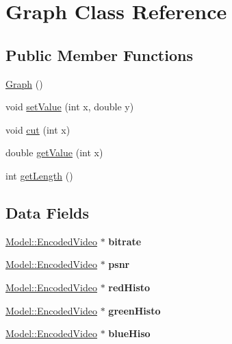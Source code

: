 \hypertarget{classModel_1_1Graph}{}\section{Graph Class Reference}
\label{classModel_1_1Graph}
\subsection*{Public Member Functions}
\begin{DoxyCompactItemize}
\item 
\hyperlink{classModel_1_1Graph_afc5ef9d72cc2c509814200791eaef62c}{Graph} ()
\item 
void \hyperlink{classModel_1_1Graph_ab2daf3a9b66c016d330dedbd83d3fa82}{set\+Value} (int x, double y)
\item 
void \hyperlink{classModel_1_1Graph_a940d481971e87001c6e4c17585b41a8e}{cut} (int x)
\item 
double \hyperlink{classModel_1_1Graph_aacd99feb76afec4bc9bdf645d4585880}{get\+Value} (int x)
\item 
int \hyperlink{classModel_1_1Graph_aab0d4bbd0884d04dbe281cc2b9d21206}{get\+Length} ()
\end{DoxyCompactItemize}
\subsection*{Data Fields}
\begin{DoxyCompactItemize}
\item 
\hypertarget{classModel_1_1Graph_a340d02df4a8d3c909b9242c450c2c4fa}{}\hyperlink{classModel_1_1EncodedVideo}{Model\+::\+Encoded\+Video} $\ast$ {\bfseries bitrate}\label{classModel_1_1Graph_a340d02df4a8d3c909b9242c450c2c4fa}

\item 
\hypertarget{classModel_1_1Graph_a6476f7924ca1e0e066bbb0da6f5ea5de}{}\hyperlink{classModel_1_1EncodedVideo}{Model\+::\+Encoded\+Video} $\ast$ {\bfseries psnr}\label{classModel_1_1Graph_a6476f7924ca1e0e066bbb0da6f5ea5de}

\item 
\hypertarget{classModel_1_1Graph_a826dee34980905d4300038e1ebc8efaf}{}\hyperlink{classModel_1_1EncodedVideo}{Model\+::\+Encoded\+Video} $\ast$ {\bfseries red\+Histo}\label{classModel_1_1Graph_a826dee34980905d4300038e1ebc8efaf}

\item 
\hypertarget{classModel_1_1Graph_adb7c23252690d5783f98e23046f785e8}{}\hyperlink{classModel_1_1EncodedVideo}{Model\+::\+Encoded\+Video} $\ast$ {\bfseries green\+Histo}\label{classModel_1_1Graph_adb7c23252690d5783f98e23046f785e8}

\item 
\hypertarget{classModel_1_1Graph_a478d40084049d5801d2c7c70a4447133}{}\hyperlink{classModel_1_1EncodedVideo}{Model\+::\+Encoded\+Video} $\ast$ {\bfseries blue\+Hiso}\label{classModel_1_1Graph_a478d40084049d5801d2c7c70a4447133}

\end{DoxyCompactItemize}


